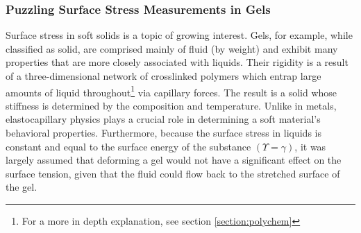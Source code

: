 
\subsubsection{Puzzling Surface Stress Measurements in Gels}
Surface stress in soft solids is a topic of growing interest. Gels, for example, while classified as solid, are comprised mainly of fluid (by weight) and exhibit many properties that are more closely associated with liquids. Their rigidity is a result of a three-dimensional network of crosslinked polymers which entrap large amounts of liquid throughout\footnote{For a more in depth explanation, see section \ref{section:polychem}} via capillary forces. The result is a solid whose stiffness is determined by the composition and temperature.  Unlike in metals, elastocapillary physics plays a crucial role in determining a soft material's behavioral properties. Furthermore, because the surface stress in liquids is constant and equal to the surface energy of the substance $(\Upsilon = \gamma)$, it was largely assumed that deforming a gel would not have a significant effect on the surface tension, given that the fluid could flow back to the stretched surface of the gel. 

